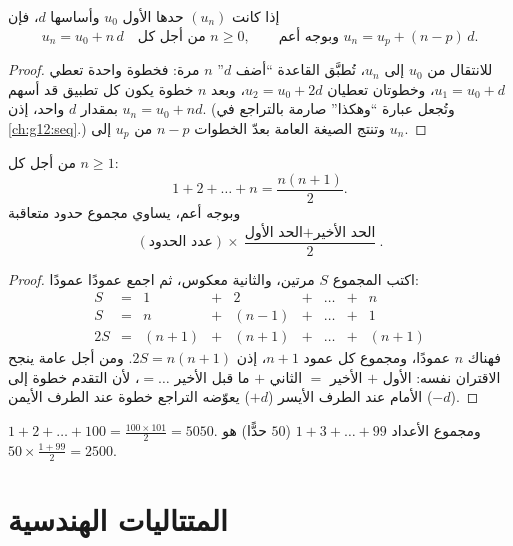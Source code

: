 \begin{theorem}\label{thm:g11:seq:arithgeneral}
إذا كانت $(u_n)$  حدها الأول $u_0$ وأساسها $d$،
فإن
\[
u_n = u_0 + n\,d \quad \text{من أجل كل } n \geq 0,
\qquad\text{وبوجه أعم } u_n = u_p + (n - p)\,d .
\]
\end{theorem}

\begin{proof}
للانتقال من $u_0$ إلى $u_n$، تُطبَّق القاعدة ``أضف $d$'' $n$ مرة: فخطوة
واحدة تعطي $u_1 = u_0 + d$، وخطوتان تعطيان $u_2 = u_0 + 2d$، وبعد $n$
خطوة يكون كل تطبيق قد أسهم بمقدار $d$ واحد، إذن $u_n = u_0 + nd$.
(وتُجعل عبارة ``وهكذا'' صارمة بالتراجع في \cref{ch:g12:seq}.)
وتنتج الصيغة العامة بعدّ الخطوات $n - p$ من $u_p$ إلى
$u_n$.
\end{proof}

\begin{theorem}\label{thm:g11:seq:intsum}
من أجل كل  $n \geq 1$:
\[
1 + 2 + \dots + n = \frac{n(n+1)}{2}.
\]
وبوجه أعم، يساوي مجموع حدود  متعاقبة
\[
(\text{عدد الحدود}) \times
\frac{\text{الحد الأول} + \text{الحد الأخير}}{2}.
\]
\end{theorem}

\begin{proof}
اكتب المجموع $S$ مرتين، والثانية  معكوس، ثم اجمع
عمودًا عمودًا:
\[
\begin{array}{ccccccccc}
S & = & 1 & + & 2 & + & \dots & + & n\\
S & = & n & + & (n-1) & + & \dots & + & 1\\
\hline
2S & = & (n+1) & + & (n+1) & + & \dots & + & (n+1)
\end{array}
\]
فهناك $n$ عمودًا، ومجموع كل عمود $n + 1$، إذن $2S = n(n+1)$. ومن أجل
 عامة ينجح الاقتران نفسه: الأول $+$ الأخير $=$
الثاني $+$ ما قبل الأخير $= \dots$، لأن التقدم خطوة إلى الأمام
عند الطرف الأيسر ($+d$) يعوّضه التراجع خطوة عند الطرف الأيمن
($-d$).
\end{proof}

\begin{example}
$1 + 2 + \dots + 100 = \frac{100 \times 101}{2} = 5050$. ومجموع
الأعداد  $1 + 3 + \dots + 99$ ($50$ حدًّا) هو
$50 \times \frac{1 + 99}{2} = 2500$.
\end{example}

\section{المتتاليات الهندسية}

